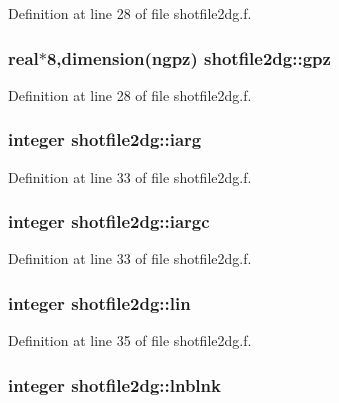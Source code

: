 Definition at line 28 of file shotfile2dg.f.\hypertarget{namespaceshotfile2dg_4175f5215674a1c9bade7bf6ba900feb}{
\subsubsection[gpz]{\setlength{\rightskip}{0pt plus 5cm}real$\ast$8,dimension(ngpz) {\bf shotfile2dg::gpz}}}
\label{namespaceshotfile2dg_4175f5215674a1c9bade7bf6ba900feb}




Definition at line 28 of file shotfile2dg.f.\hypertarget{namespaceshotfile2dg_5c10817ab16ac4db9ccc26ac2ce08d88}{
\subsubsection[iarg]{\setlength{\rightskip}{0pt plus 5cm}integer {\bf shotfile2dg::iarg}}}
\label{namespaceshotfile2dg_5c10817ab16ac4db9ccc26ac2ce08d88}




Definition at line 33 of file shotfile2dg.f.\hypertarget{namespaceshotfile2dg_ac2982c024cdf54d82169a44531a3e7f}{
\subsubsection[iargc]{\setlength{\rightskip}{0pt plus 5cm}integer {\bf shotfile2dg::iargc}}}
\label{namespaceshotfile2dg_ac2982c024cdf54d82169a44531a3e7f}




Definition at line 33 of file shotfile2dg.f.\hypertarget{namespaceshotfile2dg_dcd8847b41f8af202e2dac58135c0113}{
\subsubsection[lin]{\setlength{\rightskip}{0pt plus 5cm}integer {\bf shotfile2dg::lin}}}
\label{namespaceshotfile2dg_dcd8847b41f8af202e2dac58135c0113}




Definition at line 35 of file shotfile2dg.f.\hypertarget{namespaceshotfile2dg_8d49fa9517af47ec3a8cb815e2484ab3}{
\subsubsection[lnblnk]{\setlength{\rightskip}{0pt plus 5cm}integer {\bf shotfile2dg::lnblnk}}}
\label{namespaceshotfile2dg_8d49fa9517af47ec3a8cb815e2484ab3}




